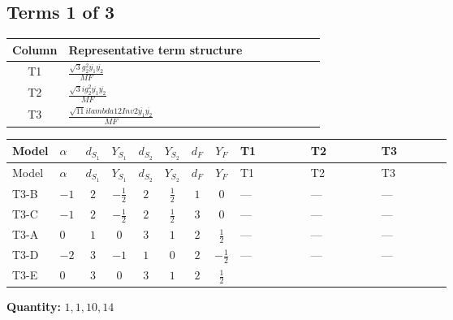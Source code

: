 \documentclass[8pt]{article}
\begin{document}
\begin{landscape}
\subsection*{Terms 1 of 3}
\begin{center}
\begin{tabular}{@{}c >{\raggedright\arraybackslash}p{0.82\linewidth}@{}}
\toprule
Column & Representative term structure \\
\midrule
T1 & \(\displaystyle \frac{\sqrt{3} g_{2}^{2} \overline{y_{1}} \overline{y_{2}}}{MF}\) \\
\midrule
T2 & \(\displaystyle \frac{\sqrt{3} i g_{2}^{2} \overline{y_{1}} \overline{y_{2}}}{MF}\) \\
\midrule
T3 & \(\displaystyle \frac{\sqrt{11} i lambda12Inv2 \overline{y_{1}} \overline{y_{2}}}{MF}\) \\
\midrule
\bottomrule
\end{tabular}
\end{center}
\smallskip
\tiny
\begin{longtable}{@{}llcccccc >{\raggedright\arraybackslash}p{0.21\linewidth} >{\raggedright\arraybackslash}p{0.21\linewidth} >{\raggedright\arraybackslash}p{0.21\linewidth}@{}}
\toprule
Model & $\alpha$ & $d_{S_1}$ & $Y_{S_1}$ & $d_{S_2}$ & $Y_{S_2}$ & $d_F$ & $Y_F$ & T1 & T2 & T3 \\
\midrule
\endfirsthead
\toprule
Model & $\alpha$ & $d_{S_1}$ & $Y_{S_1}$ & $d_{S_2}$ & $Y_{S_2}$ & $d_F$ & $Y_F$ & T1 & T2 & T3 \\
\midrule
\endhead
T3-B & $-1$ & $2$ & $-\frac{1}{2}$ & $2$ & $\frac{1}{2}$ & $1$ & $0$ & --- & --- & --- \\
\midrule
T3-C & $-1$ & $2$ & $-\frac{1}{2}$ & $2$ & $\frac{1}{2}$ & $3$ & $0$ & --- & --- & --- \\
\midrule
T3-A & $0$ & $1$ & $0$ & $3$ & $1$ & $2$ & $\frac{1}{2}$ & --- & --- & --- \\
\midrule
T3-D & $-2$ & $3$ & $-1$ & $1$ & $0$ & $2$ & $-\frac{1}{2}$ & --- & --- & --- \\
\midrule
T3-E & $0$ & $3$ & $0$ & $3$ & $1$ & $2$ & $\frac{1}{2}$ & \scriptsize\adjustbox{max width=\linewidth}{$\begin{gathered} - \frac{\sqrt{3} g_{2}^{2} \overline{y_{1}} \overline{y_{2}}}{6 MF}\end{gathered}$} & \scriptsize\adjustbox{max width=\linewidth}{$\begin{gathered} - \frac{49 \sqrt{3} i g_{2}^{2} \overline{y_{1}} \overline{y_{2}}}{24 MF}\end{gathered}$} & \scriptsize\adjustbox{max width=\linewidth}{$\begin{gathered} - \frac{3 \sqrt{11} i lambda12Inv2 \overline{y_{1}} \overline{y_{2}}}{22 MF}\end{gathered}$} \\
\midrule
\bottomrule
\end{longtable}
\clearpage
\noindent\textbf{Quantity: }$\mathrm{1,1,10,14}$\par\smallskip

\end{landscape}
\end{document}
